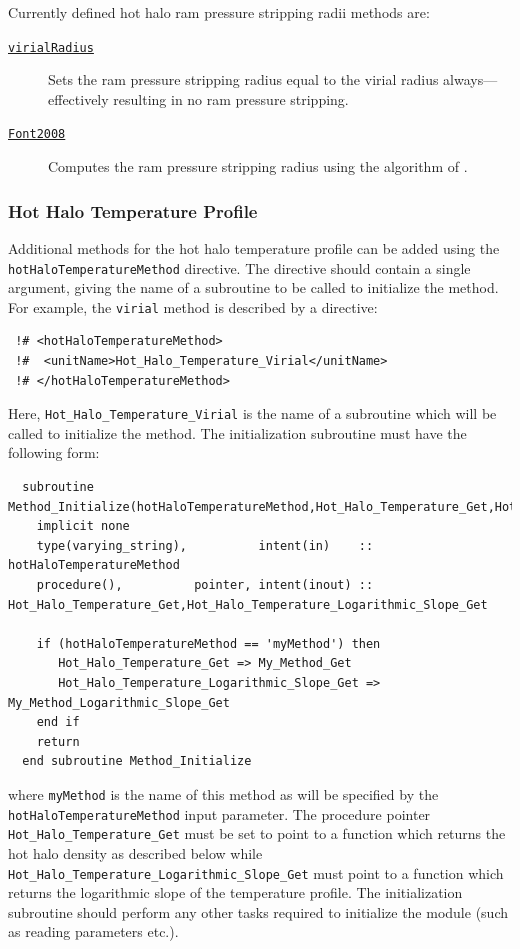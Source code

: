 Currently defined hot halo ram pressure stripping radii methods are:
\begin{description}
 \item [\hyperlink{hot_halo.ram_pressure_stripping.virial_radius.F90:hot_halo_ram_pressure_stripping_virial_radii:hot_halo_ram_pressure_stripping_virial_radius}{{\tt virialRadius}}] Sets the ram pressure stripping radius equal to the virial radius always---effectively resulting in no ram pressure stripping.
 \item [\hyperlink{hot_halo.ram_pressure_stripping.Font2008.F90:hot_halo_ram_pressure_stripping_font2008:hot_halo_ram_pressure_stripping_font2008_get}{{\tt Font2008}}] Computes the ram pressure stripping radius using the algorithm of \cite{font_colours_2008}.
\end{description}


\subsubsection{Hot Halo Temperature Profile}

Additional methods for the hot halo temperature profile can be added using the {\tt hotHaloTemperatureMethod} directive. The directive should contain a single argument, giving the name of a subroutine to be called to initialize the method. For example, the {\tt virial} method is described by a directive:
\begin{verbatim}
 !# <hotHaloTemperatureMethod>
 !#  <unitName>Hot_Halo_Temperature_Virial</unitName>
 !# </hotHaloTemperatureMethod>
\end{verbatim}
Here, {\tt Hot\_Halo\_Temperature\_Virial} is the name of a subroutine which will be called to initialize the method. The initialization subroutine must have the following form:
\begin{verbatim}
  subroutine Method_Initialize(hotHaloTemperatureMethod,Hot_Halo_Temperature_Get,Hot_Halo_Temperature_Logarithmic_Slope_Get)
    implicit none
    type(varying_string),          intent(in)    :: hotHaloTemperatureMethod
    procedure(),          pointer, intent(inout) :: Hot_Halo_Temperature_Get,Hot_Halo_Temperature_Logarithmic_Slope_Get
    
    if (hotHaloTemperatureMethod == 'myMethod') then
       Hot_Halo_Temperature_Get => My_Method_Get
       Hot_Halo_Temperature_Logarithmic_Slope_Get => My_Method_Logarithmic_Slope_Get
    end if
    return
  end subroutine Method_Initialize
\end{verbatim}
where {\tt myMethod} is the name of this method as will be specified by the {\tt hotHaloTemperatureMethod} input parameter. The procedure pointer {\tt Hot\_Halo\_Temperature\_Get} must be set to point to a function which returns the hot halo density as described below while {\tt Hot\_Halo\_Temperature\_Logarithmic\_Slope\_Get} must point to a function which returns the logarithmic slope of the temperature profile. The initialization subroutine should perform any other tasks required to initialize the module (such as reading parameters etc.).

